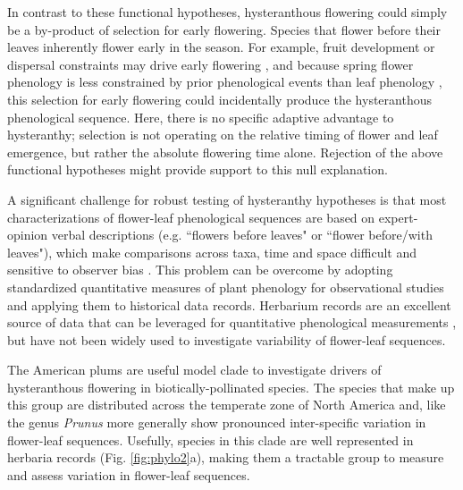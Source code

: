 \documentclass{article}[12pt]
\begin{document}
In contrast to these functional hypotheses, hysteranthous flowering could simply be a by-product of selection for early flowering. Species that flower before their leaves inherently flower early in the season. For example, fruit development or dispersal constraints may drive early flowering \citep{Primack1987}, and because spring flower phenology is less constrained by prior phenological events than leaf phenology \citep{Ettinger2018,Savage2019}, this selection for early flowering could incidentally produce the hysteranthous phenological sequence. Here, there is no specific adaptive advantage to hysteranthy;  selection is not operating on the relative timing of flower and leaf emergence, but rather the absolute flowering time alone. Rejection of the above functional hypotheses might provide support to this null explanation. 

\noindent A significant challenge for robust testing of hysteranthy hypotheses is that most characterizations of flower-leaf phenological sequences are based on expert-opinion verbal descriptions (e.g. ``flowers before leaves" or ``flower before/with leaves"), which make comparisons across taxa, time and space difficult and sensitive to observer bias  \citep[see][]{Buonaiuto2020}. This problem can be overcome by adopting standardized quantitative measures of plant phenology for observational studies and applying them to historical data records. Herbarium records are an excellent source of data that can be leveraged for quantitative phenological measurements \citep{Willis2017}, but have not been widely used to investigate variability of flower-leaf sequences.

\noindent The American plums %
are useful model clade to investigate drivers of hysteranthous flowering in biotically-pollinated species. The species that make up this group are distributed across the temperate zone of North America and, like the genus \textit{Prunus} more generally show pronounced inter-specific variation in flower-leaf sequences. Usefully, species in this clade are well represented in herbaria records (Fig. \ref{fig:phylo2}a), making them a tractable group to measure and assess variation in flower-leaf sequences.
\end{document}
